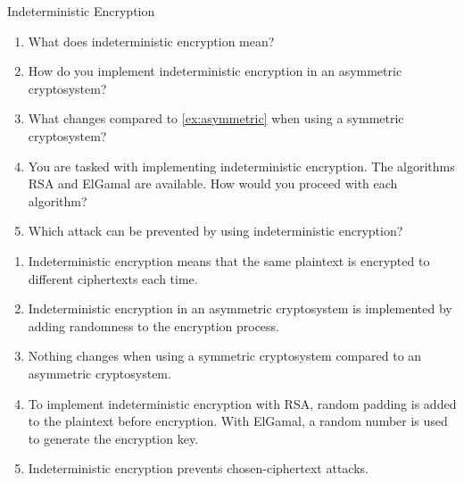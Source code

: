 \documentclass{article}
\begin{document}
\begin{exercise}{Indeterministic Encryption}
  \begin{enumerate}
    \item What does indeterministic encryption mean?
    \item\label{ex:asymmetric} How do you implement indeterministic encryption in an asymmetric cryptosystem?
    \item What changes compared to \ref{ex:asymmetric} when using a symmetric cryptosystem?
    \item You are tasked with implementing indeterministic encryption. The algorithms RSA and ElGamal are available. How would you proceed with each algorithm?
    \item Which attack can be prevented by using indeterministic encryption?
  \end{enumerate}

  \begin{solution}
    \begin{enumerate}
      \item Indeterministic encryption means that the same plaintext is encrypted to different ciphertexts each time.
      \item Indeterministic encryption in an asymmetric cryptosystem is implemented by adding randomness to the encryption process.
      \item Nothing changes when using a symmetric cryptosystem compared to an asymmetric cryptosystem.
      \item To implement indeterministic encryption with RSA, random padding is added to the plaintext before encryption. With ElGamal, a random number is used to generate the encryption key.
      \item Indeterministic encryption prevents chosen-ciphertext attacks.
    \end{enumerate}
  \end{solution}
\end{exercise}
\end{document}
